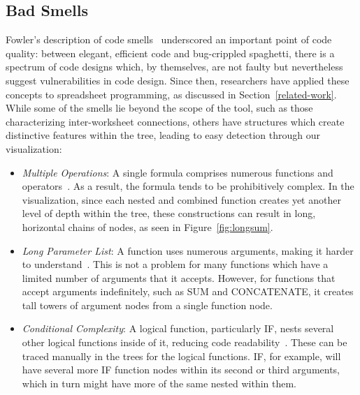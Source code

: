 \documentclass[conference]{IEEEtran}
\begin{document}
	\subsection{Bad Smells} \label{badsmells} Fowler's description of code
	smells~\cite{fowler2009refactoring} underscored an important point of code
	quality: between elegant, efficient code and bug-crippled spaghetti, there is a
	spectrum of code designs which, by themselves, are not faulty but nevertheless
	suggest vulnerabilities in code design. Since then, researchers have applied
	these concepts to spreadsheet programming, as discussed in
	Section~\ref{related-work}. While some of the smells lie beyond the scope of
	the tool, such as those characterizing inter-worksheet connections, others have
	structures which create distinctive features within the tree, leading to easy
	detection through our visualization: 
	
	\begin{itemize}
		
		\item \textit{Multiple Operations}: A single formula comprises numerous
		functions and operators~\cite{hermans2012detecting}. As a result, the formula
		tends to be prohibitively complex. In the visualization, since each nested and
		combined function creates yet another level of depth within the tree, these
		constructions can result in long, horizontal chains of nodes, as seen in
		Figure~\ref{fig:longsum}.
		
		\item \textit{Long Parameter List}: A function uses numerous arguments, making
		it harder to understand~\cite{asavametha2012detecting}. This is not a problem
		for many functions which have a limited number of arguments that it accepts.
		However, for functions that accept arguments indefinitely, such as SUM and
		CONCATENATE, it creates tall towers of argument nodes from a single function
		node.
		
		\item \textit{Conditional Complexity}: A logical function, particularly IF,
		nests several other logical functions inside of it, reducing code
		readability~\cite{hermans2012detecting}. These can be traced manually in the
		trees for the logical functions. IF, for example, will have several more IF
		function nodes within its second or third arguments, which in turn might have
		more of the same nested within them.
		
	\end{itemize}
	
\end{document}
